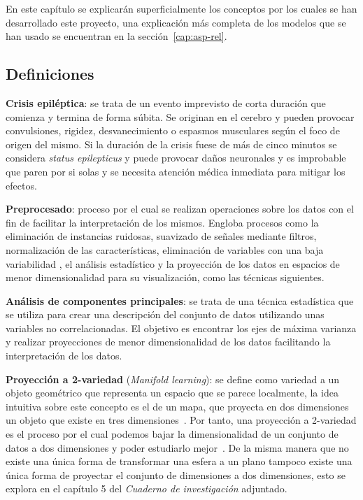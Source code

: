 
En este capítulo se explicarán superficialmente los conceptos por los cuales se han desarrollado este proyecto, una explicación más completa de los modelos que se han usado se encuentran en la sección~\ref{cap:asp-rel}.

\subsection{Definiciones}

\textbf{Crisis epiléptica}: se trata de un evento imprevisto de corta duración que comienza y termina de forma súbita. Se originan en el cerebro y pueden provocar convulsiones, rigidez, desvanecimiento o espasmos musculares según el foco de origen del mismo. Si la duración de la crisis fuese de más de cinco minutos se considera \textit{status epilepticus} y puede provocar daños neuronales y es improbable que paren por si solas y se necesita atención médica inmediata para mitigar los efectos.~\cite{epilepsia}

\textbf{Preprocesado}: proceso por el cual se realizan operaciones sobre los datos con el fin de facilitar la interpretación de los mismos. Engloba procesos como la eliminación de instancias ruidosas, suavizado de señales mediante filtros, normalización de las características, eliminación de variables con una baja variabilidad , el análisis estadístico y la proyección de los datos en espacios de menor dimensionalidad para su visualización, como las técnicas siguientes.~\cite{ubu:mineria1}

\textbf{Análisis de componentes principales}: se trata de una técnica estadística que se utiliza para crear una descripción del conjunto de datos utilizando unas variables no correlacionadas. El objetivo es encontrar los ejes de máxima varianza y realizar proyecciones de menor dimensionalidad de los datos facilitando la interpretación de los datos.~\cite{wiki:pca}

\textbf{Proyección a 2-variedad} (\textit{Manifold learning}): se define como variedad a un objeto geométrico que representa un espacio que se parece localmente, la idea intuitiva sobre este concepto es el de un mapa, que proyecta en dos dimensiones un objeto que existe en tres dimensiones~\cite{wiki:manifold}. Por tanto, una proyección a 2-variedad es el proceso por el cual podemos bajar la dimensionalidad de un conjunto de datos a dos dimensiones y poder estudiarlo mejor~\cite{tool:scikit-learn}. De la misma manera que no existe una única forma de transformar una esfera a un plano tampoco existe una única forma de proyectar el conjunto de dimensiones a dos dimensiones, esto se explora en el capítulo 5 del \textit{Cuaderno de investigación} adjuntado.

